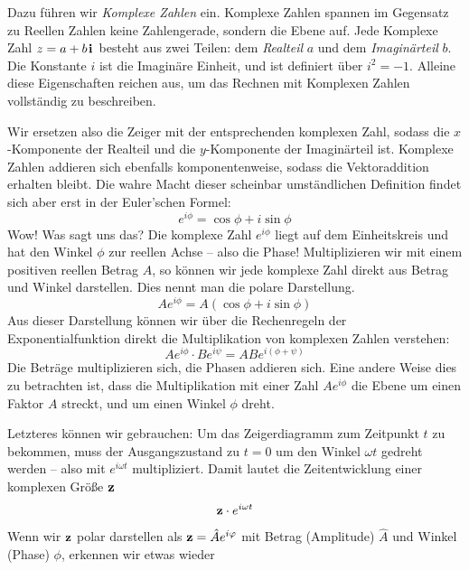 
Dazu führen wir \emph{Komplexe Zahlen} ein. Komplexe Zahlen spannen im Gegensatz zu Reellen Zahlen keine Zahlengerade,
sondern die Ebene auf. Jede Komplexe Zahl $z = a+b\mathbf{\kern1pti\kern1pt}$ besteht aus zwei Teilen: dem \emph{Realteil} $a$ und dem
\emph{Imaginärteil} $b$. Die Konstante $i$ ist die Imaginäre Einheit, und ist definiert über $i^2 = -1$. Alleine diese
Eigenschaften reichen aus, um das Rechnen mit Komplexen Zahlen vollständig zu beschreiben.

Wir ersetzen also die Zeiger mit der entsprechenden komplexen Zahl, sodass die $x$-Komponente der Realteil und die
$y$-Komponente der Imaginärteil ist. Komplexe Zahlen addieren sich ebenfalls komponentenweise, sodass die Vektoraddition
erhalten bleibt. Die wahre Macht dieser scheinbar umständlichen Definition findet sich aber erst in der Euler'schen
Formel:
\begin{equation}\label{eq:euler}
    e^{i\phi} = \cos \phi + i\sin \phi
\end{equation}
Wow! Was sagt uns das? Die komplexe Zahl $e^{i\phi}$ liegt auf dem Einheitskreis und hat den Winkel $\phi$ zur reellen
Achse -- also die Phase! Multiplizieren wir mit einem positiven reellen Betrag $A$, so können wir jede komplexe Zahl direkt
aus Betrag und Winkel darstellen. Dies nennt man die polare Darstellung.
\begin{equation}\label{eq:polar}
    Ae^{i\phi} = A(\cos \phi + i\sin \phi)
\end{equation}
Aus dieser Darstellung können wir über die Rechenregeln der Exponentialfunktion direkt die Multiplikation von komplexen
Zahlen verstehen:
\[ Ae^{i\phi} \cdot Be^{i\psi} = ABe^{i(\phi+\psi)} \]
Die Beträge multiplizieren sich, die Phasen addieren sich. Eine andere Weise dies zu betrachten ist, dass die
Multiplikation mit einer Zahl $Ae^{i\phi}$ die Ebene um einen Faktor $A$ streckt, und um einen Winkel $\phi$ dreht.

Letzteres können wir gebrauchen: Um das Zeigerdiagramm zum Zeitpunkt $t$ zu bekommen, muss der Ausgangszustand zu $t=0$
um den Winkel $\omega t$ gedreht werden -- also mit $e^{i\omega t}$ multipliziert. Damit lautet die Zeitentwicklung
einer komplexen Größe $\mathbf{z}$
\begin{equation}
    \mathbf{z}\cdot e^{i\omega t}
\end{equation}
Wenn wir $\mathbf{z}$ polar darstellen als $\mathbf{z} = \hat A e^{i\varphi}$ mit Betrag (Amplitude) $\hat A$ und Winkel (Phase) $\phi$, erkennen wir
etwas wieder

